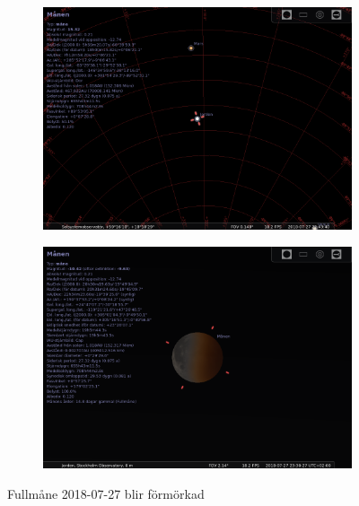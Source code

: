 \documentclass[./exercises.tex]{subfiles}
\begin{document}
\begin{itemize}
\begin{figure}[H]
     \hfill
     \begin{subfigure}[b]{0.45\textwidth}
         \centering
         \includegraphics[width=\textwidth]{Stellarium1/20180727/stellarium-002.png}
         \caption{}
         \label{fig:three sin x}
     \end{subfigure}
     \hfill
     \begin{subfigure}[b]{0.45\textwidth}
         \centering
         \includegraphics[width=\textwidth]{Stellarium1/20180727/stellarium-003.png}
         \caption{}
         \label{fig:three sin x}
     \end{subfigure}
     \hfill
        \caption{ Fullmåne 2018-07-27 blir förmörkad}
        \label{fig:perod graphs}
\end{figure}
\end{itemize}
\newpage
\end{document}
